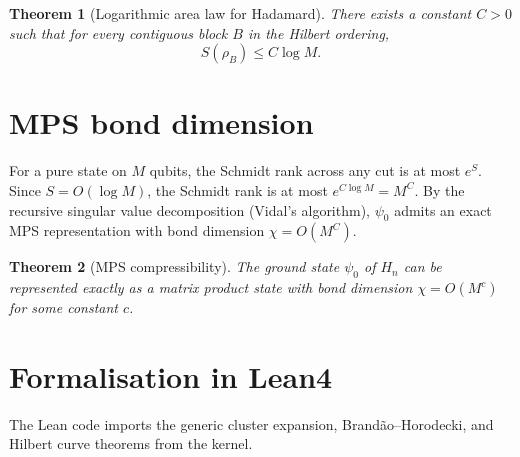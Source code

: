 \documentclass[11pt,a4paper]{article}
\newtheorem{theorem}{Theorem}[section]
\begin{document}
\begin{theorem}[Logarithmic area law for Hadamard]\label{thm:logarea}
There exists a constant $C>0$ such that for every contiguous block $B$ in the Hilbert ordering,
\[
S(\rho_B) \le C \log M.
\]
\end{theorem}

\section{MPS bond dimension}

For a pure state on $M$ qubits, the Schmidt rank across any cut is at most $e^{S}$. Since $S = O(\log M)$, the Schmidt rank is at most $e^{C\log M} = M^{C}$. By the recursive singular value decomposition (Vidal's algorithm), $\psi_0$ admits an exact MPS representation with bond dimension $\chi = O(M^{C})$.

\begin{theorem}[MPS compressibility]\label{thm:mps}
The ground state $\psi_0$ of $H_n$ can be represented exactly as a matrix product state with bond dimension $\chi = O(M^c)$ for some constant $c$.
\end{theorem}

\section{Formalisation in Lean4}

The Lean code imports the generic cluster expansion, Brandão–Horodecki, and Hilbert curve theorems from the kernel.
\end{document}
